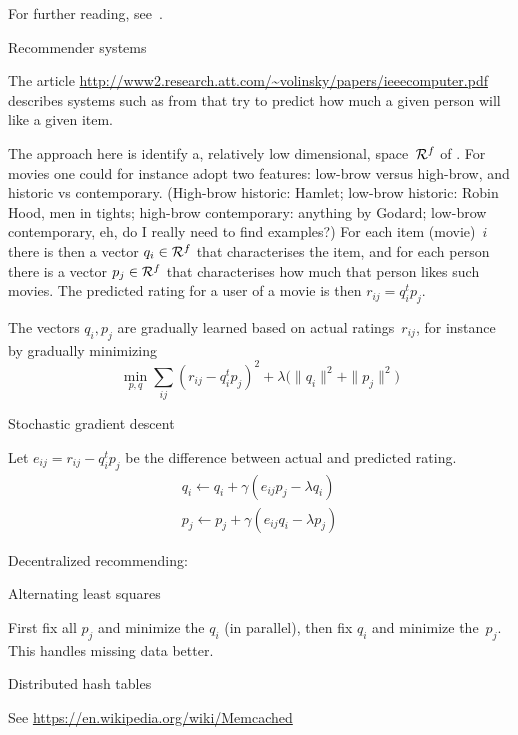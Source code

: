 For further reading, see~\cite{Sprint:classifier,ScalParC}.

 {Recommender systems}

The article 
\url{http://www2.research.att.com/~volinsky/papers/ieeecomputer.pdf}
describes systems such as from 
that try to predict how much a given person will like a given item.

The approach here is identify a, relatively low dimensional, space~${\cal R}^f$
of . For movies one could for instance adopt two features:
low-brow versus high-brow, and historic vs contemporary.
(High-brow historic: Hamlet; low-brow historic: Robin Hood, men in tights; 
high-brow contemporary: anything by Godard; low-brow contemporary, eh, 
do I really need to find examples?)
For each item (movie)~$i$ there is then a vector $q_i\in{\cal R}^f$ that characterises
the item, and for each person there is a vector $p_j\in{\cal R}^f$ that
characterises how much that person likes such movies. The predicted rating
for a user of a movie is then $r_{ij}=q_i^tp_j$.

The vectors $q_i,p_j$ are gradually learned based on actual
ratings~$r_{ij}$, for instance by gradually minimizing
\[ \min_{p,q} \sum_{ij} (r_{ij}-q_i^tp_j)^2+
    \lambda \bigl( \|q_i\|^2+\|p_j\|^2 \bigr)
\]

 {Stochastic gradient descent}

Let $e_{ij}=r_{ij}-q_i^tp_j$ be the difference between actual and predicted rating.
\[
\begin{array}{l}
  q_i\leftarrow q_i+\gamma (e_{ij}p_j-\lambda q_i)\\
  p_j\leftarrow p_j+\gamma (e_{ij}q_i-\lambda p_j)
\end{array}
\]

Decentralized recommending:~\cite{Zheng:2016arXiv:decentral-recommend}

 {Alternating least squares}

First fix all $p_j$ and minimize the $q_i$ (in parallel),
then fix $q_i$ and minimize the~$p_j$.
This handles missing data better.


 {Distributed hash tables}

See 
\url{https://en.wikipedia.org/wiki/Memcached}
